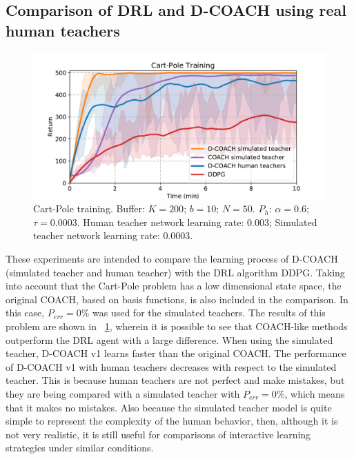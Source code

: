 \subsection{Comparison of DRL and D-COACH using real human teachers}
\begin{figure}[t]
    \centering
    \vspace{-0.2cm}
    \includegraphics[width=0.9\linewidth]{imagenes/cap3/offline_cart_pole_humans.pdf}
    \vspace{-0.2cm}
    \caption{Cart-Pole training. Buffer: $K = 200$; $b = 10$; $N = 50$. $P_{h}$: $\alpha = 0.6$; $\tau = 0.0003$. Human teacher network learning rate: $0.003$; Simulated teacher network learning rate: $0.0003$.}
    \label{fig:cartpole_results}
\end{figure}

These experiments are intended to compare the learning process of D-COACH (simulated teacher and human teacher) with the DRL algorithm DDPG. Taking into account that the Cart-Pole problem has a low dimensional state space, the original COACH, based on basis functions, is also included in the comparison. In this case, $P_\mathit{err}=0\%$ was used for the simulated teachers. The results of this problem are shown in \figurename~{\ref{fig:cartpole_results}}, wherein it is possible to see that COACH-like methods outperform the DRL agent with a large difference. When using the simulated teacher, D-COACH v1 learns faster than the original COACH. The performance of D-COACH v1 with human teachers decreases with respect to the simulated teacher. This is because human teachers are not perfect and make mistakes, but they are being compared with a simulated teacher with $P_\mathit{err}=0\%$, which means that it makes no mistakes. Also because the simulated teacher model is quite simple to represent the complexity of the human behavior, then, although it is not very realistic, it is still useful for comparisons of interactive learning strategies under similar conditions.

